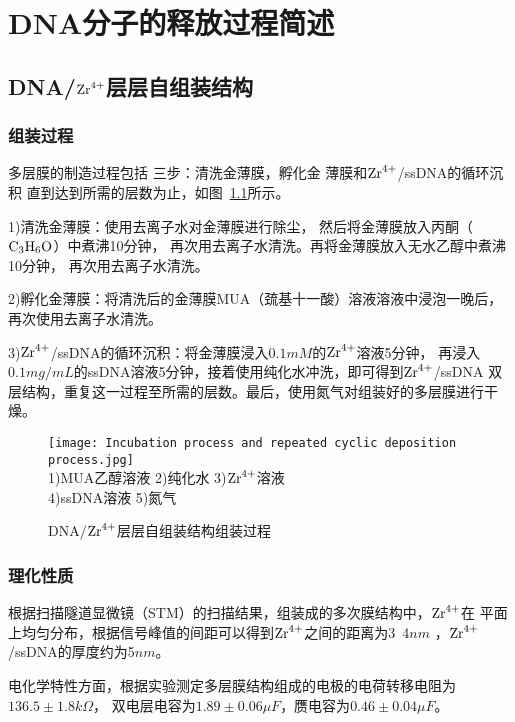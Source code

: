 \chapter{DNA分子的释放过程简述}

\section{DNA/$\ce{Zr^{4+}}$层层自组装结构}
\subsection{组装过程}
多层膜的制造过程包括
三步：清洗金薄膜，孵化金
薄膜和$\ce{Zr^{4+}}$/ssDNA的循环沉积
直到达到所需的层数为止，如图~\ref{fig:incubation_process}所示。

1)清洗金薄膜：使用去离子水对金薄膜进行除尘，
然后将金薄膜放入丙酮（$\ce{C3H6O}$）中煮沸10分钟，
再次用去离子水清洗。再将金薄膜放入无水乙醇中煮沸10分钟，
再次用去离子水清洗。

2)孵化金薄膜：将清洗后的金薄膜MUA（巯基十一酸）溶液溶液中浸泡一晚后，
再次使用去离子水清洗。

3)$\ce{Zr^{4+}}$/ssDNA的循环沉积：将金薄膜浸入$0.1mM$的$\ce{Zr^{4+}}$溶液5分钟，
再浸入$0.1mg/mL$的ssDNA溶液5分钟，接着使用纯化水冲洗，即可得到$\ce{Zr^{4+}}$/ssDNA
双层结构，重复这一过程至所需的层数。最后，使用氮气对组装好的多层膜进行干燥。

\begin{figure}[ht]
    \centering
    \texttt{[image: Incubation process and repeated cyclic deposition process.jpg]}\\
    1)MUA乙醇溶液 2)纯化水 3)$\ce{Zr^{4+}}$溶液 \\
    4)ssDNA溶液 5)氮气\\
    \caption{DNA/$\ce{Zr^{4+}}$层层自组装结构组装过程}
    \label{fig:incubation_process}
\end{figure}

\subsection{理化性质}
根据扫描隧道显微镜（STM）的扫描结果，组装成的多次膜结构中，$\ce{Zr^{4+}}$在
平面上均匀分布，根据信号峰值的间距可以得到$\ce{Zr^{4+}}$之间的距离为3~4$nm$
，$\ce{Zr^{4+}}$/ssDNA的厚度约为5$nm$\cite{Shervedani2011Electrochemical}。

电化学特性方面，根据实验测定\cite{Karimi2011}多层膜结构组成的电极的电荷转移电阻为$136.5\pm1.8k\Omega$，
双电层电容为$1.89\pm0.06\mu F$，赝电容为$0.46\pm0.04\mu F$。


